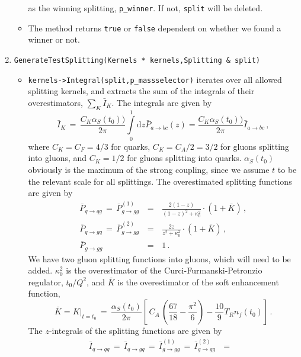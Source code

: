 \documentclass[a4]{article}
\newcommand{\done}{\mathrm{d}}
\begin{document}
\begin{enumerate}
\begin{itemize}
    as the winning splitting, {\tt p\_winner}.  If not, {\tt split} will be deleted.
  \item The method returns {\tt true} or {\tt false} dependent on whether we found a winner or not.
  \end{itemize}
\item {\tt GenerateTestSplitting(Kernels * kernels,Splitting \& split)}\\
  \begin{itemize}
  \item {\tt kernels->Integral(split,p\_massselector)} iterates over all allowed splitting kernels,
    and extracts the sum of the integrals of their overestimators, $\sum_K\bar{I}_K$.
    The integrals are given by
    \begin{equation}
      \bar{I}_K \,=\, \frac{C_K\alpha_S(t_0))}{2\pi}\int\limits_0^1\done z\bar{P}_{a\to bc}(z) =
      \frac{C_K\alpha_S(t_0))}{2\pi}\bar{I}_{a\to bc}\,,
    \end{equation}
    where $C_K = C_F = 4/3$ for quarks, $C_K = C_A/2 = 3/2$ for gluons splitting into gluons,
    and $C_K = 1/2$ for gluons splitting into quarks.  $\alpha_S(t_0)$ obviously is the maximum
    of the strong coupling, since we assume $t$ to be the relevant scale for all splittings.
    The overestimated splitting functions are given by
    \begin{eqnarray}
      \bar{P}_{q\to qg}\,=\,\bar{P}_{g\to gg}^{(1)}\,&=&\,\frac{2(1-z)}{(1-z)^2+\kappa_0^2}\cdot(1+\bar{K})\,,\nonumber\\
      \bar{P}_{q\to gq}\,=\,\bar{P}_{g\to gg}^{(2)}\,&=&\,\frac{2z}{z^2+\kappa_0^2}\cdot(1+\bar{K})\,,\nonumber\\
      \bar{P}_{g\to gg}\, &=& \,1\,.
    \end{eqnarray}
    We have two gluon splitting functions into gluons, which will need to be added.  
    $\kappa_0^2$ is the overestimator of the Curci-Furmanski-Petronzio regulator, $t_0/Q^2$,
    and $\bar{K}$ is the overestimator of the soft enhancement function,
    \begin{equation}
      \bar{K} = \left.K\right|_{t=t_0} \,=\,
      \frac{\alpha_S(t_0)}{2\pi}\left[\,C_A\,\left(\frac{67}{18}-\frac{\pi^2}{6}\right)-
        \frac{10}{9}T_Rn_f(t_0)\right]\,.
    \end{equation}
    The $z$-integrals of the splitting functions are given by
    \begin{eqnarray}
      \bar{I}_{q\to qg}\,=\,\bar{I}_{q\to gq}\,=\,
      \bar{I}_{g\to gg}^{(1)}\,=\,\bar{I}_{g\to gg}^{(2)}\,&=&\,

\end{eqnarray}
\end{itemize}
\end{enumerate}
\end{document}
